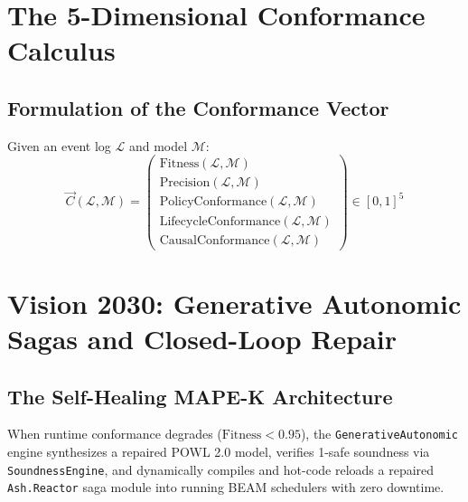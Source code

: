 \documentclass[11pt,a4paper,oneside]{book}
\theoremstyle{definition}
\begin{document}
\chapter{The 5-Dimensional Conformance Calculus}

\section{Formulation of the Conformance Vector}
Given an event log $\mathcal{L}$ and model $\mathcal{M}$:
$$\vec{C}(\mathcal{L}, \mathcal{M}) = \begin{pmatrix} 
\text{Fitness}(\mathcal{L}, \mathcal{M}) \\ 
\text{Precision}(\mathcal{L}, \mathcal{M}) \\ 
\text{PolicyConformance}(\mathcal{L}, \mathcal{M}) \\ 
\text{LifecycleConformance}(\mathcal{L}, \mathcal{M}) \\ 
\text{CausalConformance}(\mathcal{L}, \mathcal{M}) 
\end{pmatrix} \in [0, 1]^5$$

\chapter{Vision 2030: Generative Autonomic Sagas and Closed-Loop Repair}

\section{The Self-Healing MAPE-K Architecture}
When runtime conformance degrades ($\text{Fitness} < 0.95$), the \texttt{GenerativeAutonomic} engine synthesizes a repaired POWL 2.0 model, verifies 1-safe soundness via \texttt{SoundnessEngine}, and dynamically compiles and hot-code reloads a repaired \texttt{Ash.Reactor} saga module into running BEAM schedulers with zero downtime.

\end{document}
